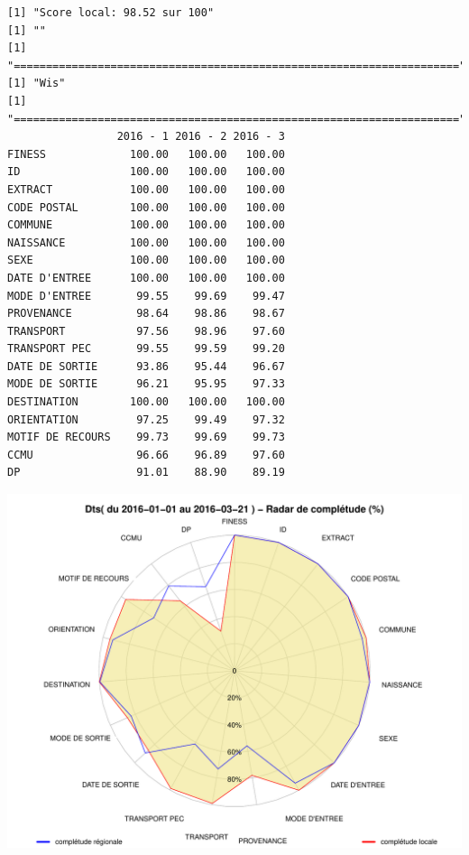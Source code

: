 \documentclass[]{article}
\begin{document}
\begin{verbatim}
[1] "Score local: 98.52 sur 100"
[1] ""
[1] "====================================================================="
[1] "Wis"
[1] "====================================================================="
                 2016 - 1 2016 - 2 2016 - 3
FINESS             100.00   100.00   100.00
ID                 100.00   100.00   100.00
EXTRACT            100.00   100.00   100.00
CODE POSTAL        100.00   100.00   100.00
COMMUNE            100.00   100.00   100.00
NAISSANCE          100.00   100.00   100.00
SEXE               100.00   100.00   100.00
DATE D'ENTREE      100.00   100.00   100.00
MODE D'ENTREE       99.55    99.69    99.47
PROVENANCE          98.64    98.86    98.67
TRANSPORT           97.56    98.96    97.60
TRANSPORT PEC       99.55    99.59    99.20
DATE DE SORTIE      93.86    95.44    96.67
MODE DE SORTIE      96.21    95.95    97.33
DESTINATION        100.00   100.00   100.00
ORIENTATION         97.25    99.49    97.32
MOTIF DE RECOURS    99.73    99.69    99.73
CCMU                96.66    96.89    97.60
DP                  91.01    88.90    89.19
\end{verbatim}

\includegraphics{completude_files/figure-latex/finess-9.pdf}
\end{document}
